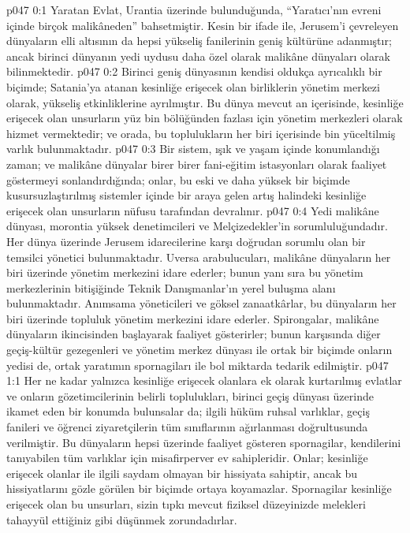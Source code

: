 \vs p047 0:1 Yaratan Evlat, Urantia üzerinde bulunduğunda, “Yaratıcı’nın evreni içinde birçok malikâneden” bahsetmiştir. Kesin bir ifade ile, Jerusem’i çevreleyen dünyaların elli altısının da hepsi yükseliş fanilerinin geniş kültürüne adanmıştır; ancak birinci dünyanın yedi uydusu daha özel olarak malikâne dünyaları olarak bilinmektedir.
\vs p047 0:2 Birinci geniş dünyasının kendisi oldukça ayrıcalıklı bir biçimde; Satania’ya atanan kesinliğe erişecek olan birliklerin yönetim merkezi olarak, yükseliş etkinliklerine ayrılmıştır. Bu dünya mevcut an içerisinde, kesinliğe erişecek olan unsurların yüz bin bölüğünden fazlası için yönetim merkezleri olarak hizmet vermektedir; ve orada, bu toplulukların her biri içerisinde bin yüceltilmiş varlık bulunmaktadır.
\vs p047 0:3 Bir sistem, ışık ve yaşam içinde konumlandığı zaman; ve malikâne dünyalar birer birer fani\hyp{}eğitim istasyonları olarak faaliyet göstermeyi sonlandırdığında; onlar, bu eski ve daha yüksek bir biçimde kusursuzlaştırılmış sistemler içinde bir araya gelen artış halindeki kesinliğe erişecek olan unsurların nüfusu tarafından devralınır.
\vs p047 0:4 Yedi malikâne dünyası, morontia yüksek denetimcileri ve Melçizedekler’in sorumluluğundadır. Her dünya üzerinde Jerusem idarecilerine karşı doğrudan sorumlu olan bir temsilci yönetici bulunmaktadır. Uversa arabulucuları, malikâne dünyaların her biri üzerinde yönetim merkezini idare ederler; bunun yanı sıra bu yönetim merkezlerinin bitişiğinde Teknik Danışmanlar’ın yerel buluşma alanı bulunmaktadır. Anımsama yöneticileri ve göksel zanaatkârlar, bu dünyaların her biri üzerinde topluluk yönetim merkezini idare ederler. Spirongalar, malikâne dünyaların ikincisinden başlayarak faaliyet gösterirler; bunun karşısında diğer geçiş\hyp{}kültür gezegenleri ve yönetim merkez dünyası ile ortak bir biçimde onların yedisi de, ortak yaratımın spornagiları ile bol miktarda tedarik edilmiştir.
\vs p047 1:1 Her ne kadar yalnızca kesinliğe erişecek olanlara ek olarak kurtarılmış evlatlar ve onların gözetimcilerinin belirli toplulukları, birinci geçiş dünyası üzerinde ikamet eden bir konumda bulunsalar da; ilgili hüküm ruhsal varlıklar, geçiş fanileri ve öğrenci ziyaretçilerin tüm sınıflarının ağırlanması doğrultusunda verilmiştir. Bu dünyaların hepsi üzerinde faaliyet gösteren spornagilar, kendilerini tanıyabilen tüm varlıklar için misafirperver ev sahipleridir. Onlar; kesinliğe erişecek olanlar ile ilgili saydam olmayan bir hissiyata sahiptir, ancak bu hissiyatlarını gözle görülen bir biçimde ortaya koyamazlar. Spornagilar kesinliğe erişecek olan bu unsurları, sizin tıpkı mevcut fiziksel düzeyinizde melekleri tahayyül ettiğiniz gibi düşünmek zorundadırlar.
